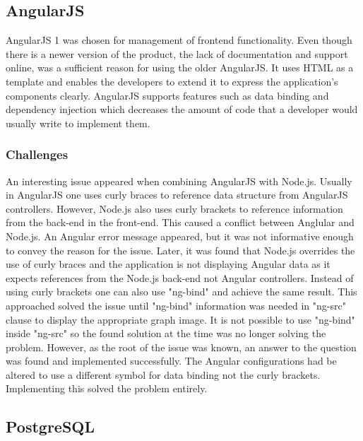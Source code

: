\documentclass{l4proj}
\begin{document}
\subsection{AngularJS}

AngularJS 1 was chosen for management of frontend functionality. Even though there is a newer version of the product, the lack of documentation and support online, was a sufficient reason for using the older AngularJS. It uses HTML as a template and enables the developers to extend it to express the application's components clearly. AngularJS supports features such as data binding and dependency injection which decreases the amount of code that a developer would usually write to implement them. 

\subsubsection{Challenges}

An interesting issue appeared when combining AngularJS with Node.js. Usually in AngularJS one uses curly braces to reference data structure from AngularJS controllers. However, Node.js also uses curly brackets to reference information from the back-end in the front-end. This caused a conflict between Anglular and Node.js. An Angular error message appeared, but it was not informative enough to convey the reason for the issue. Later, it was found that Node.js overrides the use of curly braces and the application is not displaying Angular data as it expects references from the Node.js back-end not Angular controllers. Instead of using curly brackets one can also use "ng-bind" and achieve the same result. This approached solved the issue until "ng-bind" information was needed in "ng-src" clause to display the appropriate graph image. It is not possible to use "ng-bind" inside "ng-src" so the found solution at the time was no longer solving the problem. However, as the root of the issue was known, an answer to the question was found and implemented successfully. The Angular configurations had be altered to use a different symbol for data binding not the curly brackets. Implementing this solved the problem entirely. 


\subsection{PostgreSQL}
\end{document}
